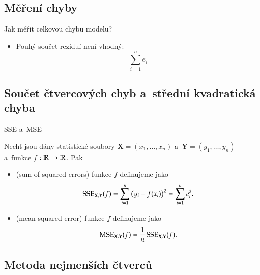 \documentclass[11pt,professionalfont,aspectratio=43]{beamer}
\begin{document}
\subsection{Měření chyby}

\begin{frame}{Jak měřit celkovou chybu modelu?}
    \begin{itemize}
        \item Pouhý součet reziduí není vhodný:
        \[
            \sum_{i=1}^n e_i
        \]
    \end{itemize}
\end{frame}

\subsection{Součet čtvercových chyb a~střední kvadratická chyba}

\begin{frame}{SSE a~MSE}
    \begin{defblock}
        Nechť jsou dány statistické soubory $\mathbf X=(x_1,\ldots,x_n)$ a~$\mathbf Y=(y_1,\ldots,y_n)$ a~funkce $f:\mathbb{R} \rightarrow \mathbb{R}$. Pak
        \begin{itemize}
            \item {} (sum of squared errors) funkce $f$ definujeme jako
            \[
                \operatorname{SSE}_{\mathbf X,\mathbf Y}(f)
                =
                \sum_{i=1}^n
                \left(y_i-f(x_i)\right)^2
                =
                \sum_{i=1}^n e_i^{2}
                .
            \]
            \item {} (mean squared error) funkce $f$ definujeme jako
            \[
                \operatorname{MSE}_{\mathbf X,\mathbf Y}(f)
                =
                \frac1n\operatorname{SSE}_{\mathbf X,\mathbf Y}(f).
            \]
        \end{itemize}
    \end{defblock}
\end{frame}

\subsection{Metoda nejmenších čtverců}
\end{document}
